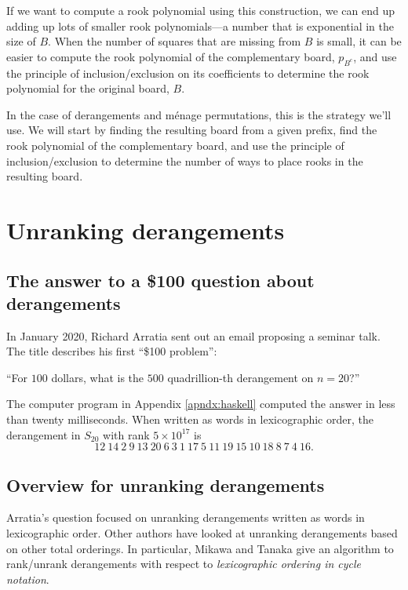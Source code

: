 If we want to compute a rook polynomial using this construction, we can end
up adding up lots of smaller rook polynomials---a number that is exponential in
the size of $B$.
When the number of squares that are missing from $B$ is small,
it can be easier to compute the rook polynomial of the complementary board,
$p_{B^c}$, and use the principle of
inclusion/exclusion on its coefficients to determine the rook polynomial for
the original board, $B$.

In the case of derangements and m\'enage permutations, this is the strategy
we'll use.
We will start by finding the resulting board from a given prefix,
find the rook polynomial of the complementary board, and
use the principle of inclusion/exclusion to determine the number of ways to
place rooks in the resulting board.

\section{Unranking derangements}

\subsection{The answer to a \$100 question about derangements}
In January 2020, Richard Arratia sent out an email proposing a seminar talk.
The title describes his first ``\$100 problem'':
\begin{problem}
``For $100$ dollars, what is the $500$ quadrillion-th derangement on $n=20$?''
\end{problem}

\begin{answer}
The computer program in Appendix \ref{apndx:haskell} computed the answer in
less than twenty milliseconds. When written as words in lexicographic order, the
derangement in $S_{20}$ with rank $5 \times 10^{17}$ is \begin{equation}
  12\ 14\ 2\ 9\ 13\ 20\ 6\ 3\ 1\ 17\ 5\ 11\ 19\ 15\ 10\ 18\ 8\ 7\ 4\ 16.
\end{equation}
\end{answer}

\subsection{Overview for unranking derangements}
Arratia's question focused on unranking derangements written as words in
lexicographic order.
Other authors have looked at unranking derangements based on other total
orderings. In particular, Mikawa and Tanaka \cite{Mikawa2014} give an algorithm
to rank/unrank derangements
with respect to \textit{lexicographic ordering in cycle notation}.

